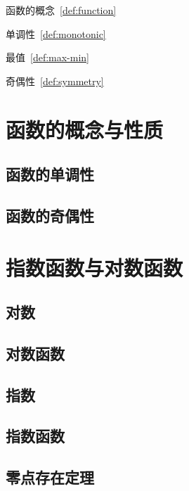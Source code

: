 \documentclass[../main.tex]{subfiles}
\begin{document}
\begin{introduction}
    \item 函数的概念~\ref{def:function}
    \item 单调性~\ref{def:monotonic}
    \item 最值~\ref{def:max-min}
    \item 奇偶性~\ref{def:symmetry}
\end{introduction}

\section{函数的概念与性质}
\begin{definition}[函数]\label{def:function}

\end{definition}

\subsection{函数的单调性}

\subsection{函数的奇偶性}


\section{指数函数与对数函数}

\subsection{对数}

\subsection{对数函数}

\subsection{指数}

\subsection{指数函数}

\subsection{零点存在定理}
\end{document}
